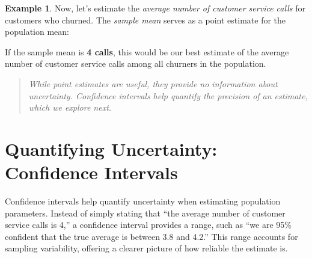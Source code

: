 \documentclass[
  11pt,
]{book}
\makeatletter
\newenvironment{Shaded}{}{}
\newcommand{\CommentTok}[1]{\textcolor[rgb]{0.36,0.36,0.36}{#1}}
\newcommand{\ControlFlowTok}[1]{\textcolor[rgb]{0.07,0.07,0.07}{#1}}
\newcommand{\FloatTok}[1]{#1}
\newcommand{\FunctionTok}[1]{#1}
\newcommand{\NormalTok}[1]{#1}
\newcommand{\OtherTok}[1]{\textcolor[rgb]{0.39,0.39,0.39}{#1}}
\newcommand{\SpecialCharTok}[1]{\textcolor[rgb]{0.39,0.39,0.39}{#1}}
\newcommand{\StringTok}[1]{\textcolor[rgb]{0.39,0.39,0.39}{#1}}
\renewenvironment{quote}{\begin{quotation}}{\end{quotation}}
\newenvironment{kframe}{%
\medskip{}
\setlength{\fboxsep}{.8em}
 \def\at@end@of@kframe{}%
 \ifinner\ifhmode%
  \def\at@end@of@kframe{\end{minipage}}%
  \begin{minipage}{\columnwidth}%
 \fi\fi%
 \def\FrameCommand##1{\hskip\@totalleftmargin \hskip-\fboxsep
 \colorbox{shadecolor}{##1}\hskip-\fboxsep
     \hskip-\linewidth \hskip-\@totalleftmargin \hskip\columnwidth}%
 \MakeFramed {\advance\hsize-\width
   \@totalleftmargin\z@ \linewidth\hsize
   \@setminipage}}%
 {\par\unskip\endMakeFramed%
 \at@end@of@kframe}
\renewenvironment{Shaded}{\begin{kframe}}{\end{kframe}}
\theoremstyle{definition}
\theoremstyle{definition}
\newtheorem{example}{Example}[chapter]
\theoremstyle{definition}
\theoremstyle{definition}
\theoremstyle{remark}
\makeatother
\begin{document}
\begin{example}
\protect\hypertarget{exm:ex-est-service-call}{}\label{exm:ex-est-service-call}Now, let's estimate the \emph{average number of customer service calls} for customers who churned. The \emph{sample mean} serves as a point estimate for the population mean:

\begin{Shaded}
\end{Shaded}

If the sample mean is \textbf{4 calls}, this would be our best estimate of the average number of customer service calls among all churners in the population.
\end{example}

\begin{quote}
\emph{While point estimates are useful, they provide no information about uncertainty. Confidence intervals help quantify the precision of an estimate, which we explore next.}
\end{quote}

\section{Quantifying Uncertainty: Confidence Intervals}\label{statistics-confidence-interval}

Confidence intervals help quantify uncertainty when estimating population parameters. Instead of simply stating that ``the average number of customer service calls is 4,'' a confidence interval provides a range, such as ``we are 95\% confident that the true average is between 3.8 and 4.2.'' This range accounts for sampling variability, offering a clearer picture of how reliable the estimate is.
\end{document}
